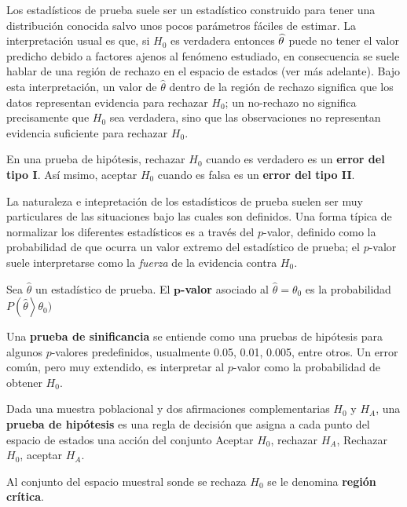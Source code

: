 Los estadísticos de prueba suele ser un estadístico construido para tener una distribución conocida salvo unos pocos parámetros fáciles de estimar.
%
La interpretación usual es que, si $H_0$ es verdadera entonces $\widehat{ \theta }$ puede no tener el valor predicho debido a factores ajenos al fenómeno estudiado, en consecuencia se suele hablar de una región de rechazo en el espacio de estados (ver más adelante).
%
Bajo esta interpretación, un valor de $\widehat{\theta}$ dentro de la región de rechazo significa que los datos representan evidencia para rechazar $H_0$; un no-rechazo no significa precisamente que $H_0$ sea verdadera, sino que las observaciones no representan evidencia suficiente para rechazar $H_0$.

\begin{definicion}
En una prueba de hipótesis, rechazar $H_0$ cuando es verdadero es un \textbf{error del tipo I}. Así msimo, aceptar $H_0$ cuando es falsa es un \textbf{error del tipo II}.
\end{definicion}

La naturaleza e intepretación de los estadísticos de prueba suelen ser muy particulares de las situaciones bajo las cuales son definidos.
%
Una forma típica de normalizar los diferentes estadísticos es a través del $p$-valor, definido como la probabilidad de que ocurra un valor extremo del estadístico de prueba; 
el $p$-valor suele interpretarse como la \textit{fuerza} de la evidencia contra $H_0$.

\begin{definicion}
Sea $\widehat{\theta}$ un estadístico de prueba. El \textbf{$\boldsymbol{p}$-valor} asociado al $\widehat{\theta}=\theta_0$ es la probabilidad $P\left(\widehat{\theta}\right>\theta_0)$
\end{definicion}

Una \textbf{prueba de sinificancia} se entiende como una pruebas de hipótesis para algunos $p$-valores predefinidos, usualmente 0.05, 0.01, 0.005, entre otros.
%
Un error común, pero muy extendido, es interpretar al $p$-valor como la probabilidad de obtener $H_0$.

\begin{definicion}
Dada una muestra poblacional y dos afirmaciones complementarias $H_0$ y $H_A$, una \textbf{prueba de hipótesis} es una regla de decisión que asigna a cada punto del espacio de estados una acción del conjunto Aceptar $H_0$, rechazar $H_A$, Rechazar $H_0$, aceptar $H_A$.

Al conjunto del espacio muestral sonde se rechaza $H_0$ se le denomina \textbf{región crítica}. 
\end{definicion}

